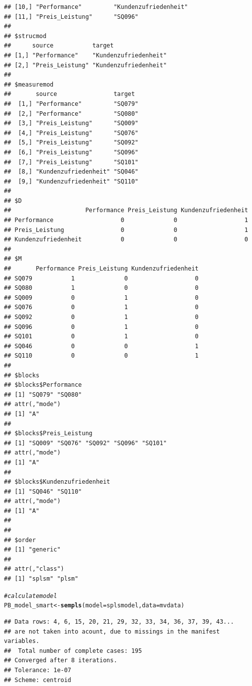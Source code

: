 \documentclass{article}\usepackage[]{graphicx}\usepackage[]{color}
\makeatletter
\newcommand{\hlcom}[1]{\textcolor[rgb]{0.678,0.584,0.686}{\textit{#1}}}%
\newcommand{\hlstd}[1]{\textcolor[rgb]{0.345,0.345,0.345}{#1}}%
\newcommand{\hlkwb}[1]{\textcolor[rgb]{0.69,0.353,0.396}{#1}}%
\newcommand{\hlkwc}[1]{\textcolor[rgb]{0.333,0.667,0.333}{#1}}%
\newcommand{\hlkwd}[1]{\textcolor[rgb]{0.737,0.353,0.396}{\textbf{#1}}}%
\newenvironment{kframe}{%
 \def\at@end@of@kframe{}%
 \ifinner\ifhmode%
  \def\at@end@of@kframe{\end{minipage}}%
  \begin{minipage}{\columnwidth}%
 \fi\fi%
 \def\FrameCommand##1{\hskip\@totalleftmargin \hskip-\fboxsep
 \colorbox{shadecolor}{##1}\hskip-\fboxsep
     \hskip-\linewidth \hskip-\@totalleftmargin \hskip\columnwidth}%
 \MakeFramed {\advance\hsize-\width
   \@totalleftmargin\z@ \linewidth\hsize
   \@setminipage}}%
 {\par\unskip\endMakeFramed%
 \at@end@of@kframe}
\newenvironment{knitrout}{}{} %
\makeatother
\begin{document}
\begin{knitrout}
\begin{kframe}
\begin{verbatim}
## [10,] "Performance"         "Kundenzufriedenheit"
## [11,] "Preis_Leistung"      "SQ096"              
## 
## $strucmod
##      source           target               
## [1,] "Performance"    "Kundenzufriedenheit"
## [2,] "Preis_Leistung" "Kundenzufriedenheit"
## 
## $measuremod
##       source                target 
##  [1,] "Performance"         "SQ079"
##  [2,] "Performance"         "SQ080"
##  [3,] "Preis_Leistung"      "SQ009"
##  [4,] "Preis_Leistung"      "SQ076"
##  [5,] "Preis_Leistung"      "SQ092"
##  [6,] "Preis_Leistung"      "SQ096"
##  [7,] "Preis_Leistung"      "SQ101"
##  [8,] "Kundenzufriedenheit" "SQ046"
##  [9,] "Kundenzufriedenheit" "SQ110"
## 
## $D
##                     Performance Preis_Leistung Kundenzufriedenheit
## Performance                   0              0                   1
## Preis_Leistung                0              0                   1
## Kundenzufriedenheit           0              0                   0
## 
## $M
##       Performance Preis_Leistung Kundenzufriedenheit
## SQ079           1              0                   0
## SQ080           1              0                   0
## SQ009           0              1                   0
## SQ076           0              1                   0
## SQ092           0              1                   0
## SQ096           0              1                   0
## SQ101           0              1                   0
## SQ046           0              0                   1
## SQ110           0              0                   1
## 
## $blocks
## $blocks$Performance
## [1] "SQ079" "SQ080"
## attr(,"mode")
## [1] "A"
## 
## $blocks$Preis_Leistung
## [1] "SQ009" "SQ076" "SQ092" "SQ096" "SQ101"
## attr(,"mode")
## [1] "A"
## 
## $blocks$Kundenzufriedenheit
## [1] "SQ046" "SQ110"
## attr(,"mode")
## [1] "A"
## 
## 
## $order
## [1] "generic"
## 
## attr(,"class")
## [1] "splsm" "plsm"
\end{verbatim}
\begin{alltt}
\hlcom{#calculate model}
\hlstd{PB_model_smart} \hlkwb{<-} \hlkwd{sempls}\hlstd{(}\hlkwc{model} \hlstd{= splsmodel,}\hlkwc{data} \hlstd{= mvdata)}
\end{alltt}
\begin{verbatim}
## Data rows: 4, 6, 15, 20, 21, 29, 32, 33, 34, 36, 37, 39, 43...
## are not taken into acount, due to missings in the manifest variables.
##  Total number of complete cases: 195 
## Converged after 8 iterations.
## Tolerance: 1e-07
## Scheme: centroid
\end{verbatim}
\begin{alltt}

\end{alltt}
\end{kframe}
\end{knitrout}
\end{document}
